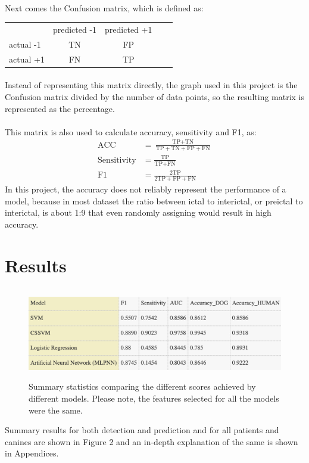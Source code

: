 \documentclass[10pt,twocolumn,letterpaper]{article}
\begin{document}
\paragraph{}Next comes the Confusion matrix, which is defined as:
\begin{table}[h]
\begin{tabular}{lllll}
          & predicted -1           & predicted +1             \\
actual -1 & \multicolumn{1}{c}{TN} & \multicolumn{1}{c}{FP}   \\
actual +1 & \multicolumn{1}{c}{FN} & \multicolumn{1}{c}{TP}   	
\end{tabular}
\end{table}
\paragraph{}Instead of representing this matrix directly, the graph used in this project is the Confusion matrix divided by the number of data points, so the resulting matrix is represented as the percentage.
\paragraph{} This matrix is also used to calculate accuracy, sensitivity and F1, as:
\begin{align*}
\text{ACC} &= \frac{\text{TP}+\text{TN}}{\text{TP}+\text{TN}+\text{FP}+\text{FN}}\\
\text{Sensitivity} &= \frac{\text{TP}}{\text{TP}+\text{FN}}\\
\text{F1} &= \frac{2\text{TP}}{2\text{TP}+\text{FP}+\text{FN}}
\end{align*}
In this project, the accuracy does not reliably represent the performance of a model, because in most dataset the ratio between ictal to interictal, or preictal to interictal, is about 1:9 that even randomly assigning would result in high accuracy.



\section{Results}

\begin{figure}[h]
  \centering
  \includegraphics[width=\textwidth,height=4cm]{fwe.png}
  \caption{Summary statistics comparing the different scores achieved by different models. Please note, the features selected for all the models were the same. }
\end{figure}
Summary results for both detection and prediction and for all patients and canines are shown in Figure 2 and an in-depth explanation of the same is shown in Appendices.
\end{document}

